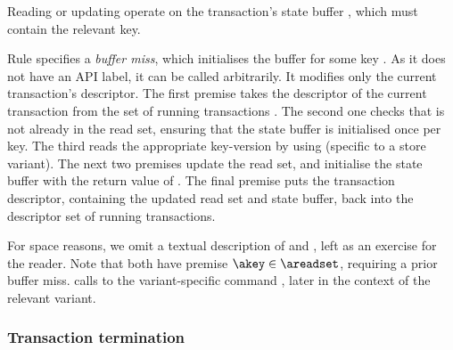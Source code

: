 Reading or updating operate on the transaction's state buffer
\astatebuf{}, which must contain the relevant key.

Rule \initkeyrule{} specifies a \emph{buffer miss}, which initialises
the buffer for some key \akey{}.
As it does not have an API label, it can be called arbitrarily.
It modifies only the current transaction's descriptor.
The first premise takes the descriptor of the current transaction
\atrans{} from the set of running transactions \atrsetr{}.
The second one checks that \akey{} is not already in the read set,
ensuring that the state buffer is initialised once per key.
The third reads the appropriate key-version by using \lookup{} (specific
to a store variant).
The next two premises update the read set, and initialise the state
buffer with the return value of \lookup{}.
The final premise puts the transaction descriptor, containing the
updated read set and state buffer, back into the descriptor set of
running transactions.


For space reasons, we omit a textual description of \readrule{} and
\updaterule{}, left as an exercise for the reader.
Note that both have premise $\akey \in {\areadset}$, requiring a prior
buffer miss.
\readrule calls to the variant-specific command \doUpdate{}, later in
the context of the relevant variant.



\subsubsection{Transaction termination}


